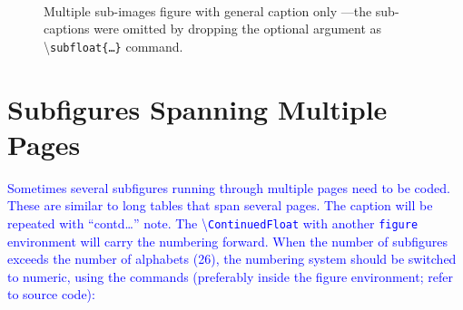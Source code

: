 \documentclass[phd]{ndsu-thesis-2022}
\newcommand\italk[1]{\textcolor{blue}{#1}}  %
\newcommand\cmd[1]{\textbackslash\texttt{#1}}  %
\begin{document}
\begin{figure}[H]
\hspace{0.25in}
\hspace{0.25in}
\hspace{0.25in}
\hspace{0.25in}
\hspace{0.25in}\\

\captionsetup{singlelinecheck=false} %
\caption{Multiple sub-images figure with general caption only ---the sub-captions were omitted by dropping the optional argument as \cmd{subfloat\{\ldots\}} command.} \label{fig6a}
\end{figure}


\section{Subfigures Spanning Multiple Pages}
\italk{Sometimes several subfigures running through multiple pages need to be coded. These are similar to long tables that span several pages. The caption will be repeated with ``contd\ldots'' note. The \cmd{ContinuedFloat} with another \texttt{figure} environment will carry the numbering forward. When the number of subfigures exceeds the number of alphabets (26), the numbering system should be switched to numeric, using the commands (preferably inside the figure environment; refer to source code): }
\end{document}
